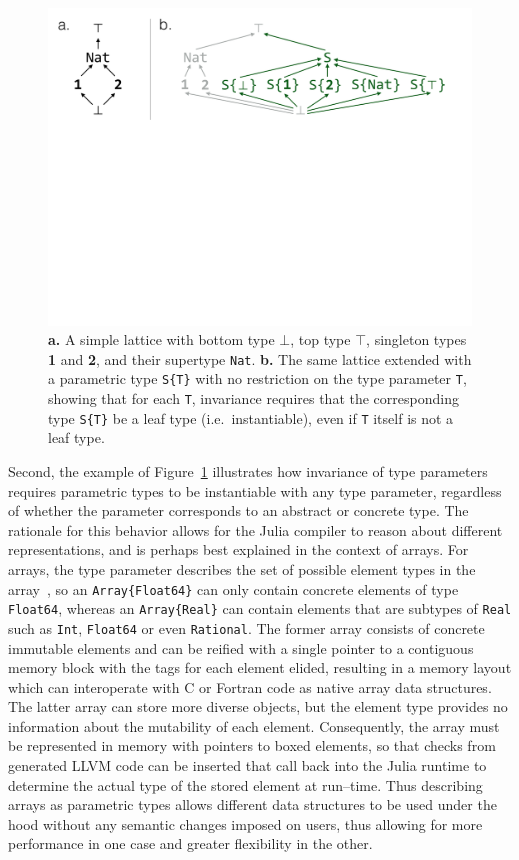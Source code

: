 \documentclass[pldi]{sigplanconf-pldi15}
\begin{document}
\begin{figure}
	\centering
	\includegraphics[width=\columnwidth]{fig-lattice}
	\caption{
		\textbf{a.} A simple lattice with bottom type $\bot$, top type
		$\top$, singleton types \textbf{1} and \textbf{2}, and their
		supertype \texttt{Nat}.
		\textbf{b.} The same lattice extended with a parametric type
		\texttt{S\{T\}} with no restriction on the type parameter
		\texttt{T}, showing that for each \texttt{T}, invariance
		requires that the corresponding type \texttt{S\{T\}} be a leaf
		type (i.e.\ instantiable), even if \texttt{T} itself is not a
		leaf type.}
	\label{fig:lattice}
\end{figure}

Second, the example of Figure~\ref{fig:lattice} illustrates how invariance of
type parameters requires parametric types to be instantiable with any type
parameter, regardless of whether the parameter corresponds to an abstract or
concrete type. The rationale for this behavior allows for the Julia compiler to
reason about different representations, and is perhaps best explained in the
context of arrays. For arrays, the type parameter describes the set of possible
element types in the array~\cite{Bezanson2014}, so an \verb|Array{Float64}|
can only contain concrete elements of type \verb|Float64|, whereas an
\verb|Array{Real}| can contain elements that are subtypes of \verb|Real| such
as \verb|Int|, \verb|Float64| or even \verb|Rational|. The former array
consists of concrete immutable elements and can be reified with a single
pointer to a contiguous memory block with the tags for each element elided,
resulting in a memory layout which can interoperate with C or Fortran code as
native array data structures. The latter array can store more diverse objects,
but the element type provides no information about the mutability of each
element. Consequently, the array must be represented in memory with pointers to
boxed elements, so that checks from generated LLVM code can be inserted that
call back into the Julia runtime to determine the actual type of the stored
element at run--time. Thus describing arrays as parametric types allows
different data structures to be used under the hood without any semantic
changes imposed on users, thus allowing for more performance in one case and
greater flexibility in the other.
\end{document}
